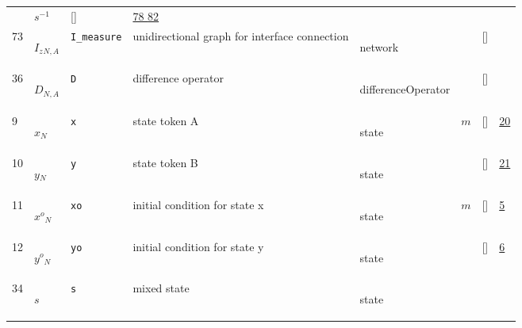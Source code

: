 \begin{longtable}{|p{1cm}|p{3cm}|p{3cm}|p{7cm}|p{3.0cm}|p{3cm}|p{2cm}|p{1cm}|}
             & $ s^{-1} \, $
             & []
             & \hyperlink{"e:78"}{ 78 }
                 \hyperlink{"e:82"}{ 82 }
                 \\
    73
             & \hypertarget{"v:73"}{ $ {{I_z}}{_{N, A}} $}
             & \verb|I_measure|
             & unidirectional graph for interface connection
             & \begin{lay}network \end{lay}
             & $  $
             & []
             & \\
    36
             & \hypertarget{"v:36"}{ $ {D}{_{N, A}} $}
             & \verb|D|
             & difference operator 
             & \begin{lay}differenceOperator \end{lay}
             & $  $
             & []
             & \\
    9
             & \hypertarget{"v:9"}{ $ {x}{_{N}} $}
             & \verb|x|
             & state token A
             & \begin{lay}state \end{lay}
             & $ m  $
             & []
             & \hyperlink{"e:20"}{ 20 }
                 \\
    10
             & \hypertarget{"v:10"}{ $ {y}{_{N}} $}
             & \verb|y|
             & state token B
             & \begin{lay}state \end{lay}
             & $  $
             & []
             & \hyperlink{"e:21"}{ 21 }
                 \\
    11
             & \hypertarget{"v:11"}{ $ {{x^o}}{_{N}} $}
             & \verb|xo|
             & initial condition for state x
             & \begin{lay}state \end{lay}
             & $ m  $
             & []
             & \hyperlink{"e:5"}{ 5 }
                 \\
    12
             & \hypertarget{"v:12"}{ $ {{y^o}}{_{N}} $}
             & \verb|yo|
             & initial condition for state y
             & \begin{lay}state \end{lay}
             & $  $
             & []
             & \hyperlink{"e:6"}{ 6 }
                 \\
    34
             & \hypertarget{"v:34"}{ $ {s}{_{}} $}
             & \verb|s|
             & mixed state
             & \begin{lay}state \end{lay}

\end{longtable}
